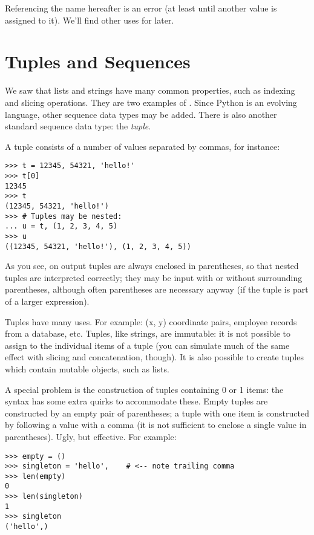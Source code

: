 \documentclass{manual}
\begin{document}
Referencing the name  hereafter is an error (at least until
another value is assigned to it).  We'll find other uses for
 later.


\section{Tuples and Sequences \label{tuples}}

We saw that lists and strings have many common properties, such as
indexing and slicing operations.  They are two examples of
.  Since
Python is an evolving language, other sequence data types may be
added.  There is also another standard sequence data type: the
\emph{tuple}.

A tuple consists of a number of values separated by commas, for
instance:

\begin{verbatim}
>>> t = 12345, 54321, 'hello!'
>>> t[0]
12345
>>> t
(12345, 54321, 'hello!')
>>> # Tuples may be nested:
... u = t, (1, 2, 3, 4, 5)
>>> u
((12345, 54321, 'hello!'), (1, 2, 3, 4, 5))
\end{verbatim}

As you see, on output tuples are always enclosed in parentheses, so
that nested tuples are interpreted correctly; they may be input with
or without surrounding parentheses, although often parentheses are
necessary anyway (if the tuple is part of a larger expression).

Tuples have many uses.  For example: (x, y) coordinate pairs, employee
records from a database, etc.  Tuples, like strings, are immutable: it
is not possible to assign to the individual items of a tuple (you can
simulate much of the same effect with slicing and concatenation,
though).  It is also possible to create tuples which contain mutable
objects, such as lists.

A special problem is the construction of tuples containing 0 or 1
items: the syntax has some extra quirks to accommodate these.  Empty
tuples are constructed by an empty pair of parentheses; a tuple with
one item is constructed by following a value with a comma
(it is not sufficient to enclose a single value in parentheses).
Ugly, but effective.  For example:

\begin{verbatim}
>>> empty = ()
>>> singleton = 'hello',    # <-- note trailing comma
>>> len(empty)
0
>>> len(singleton)
1
>>> singleton
('hello',)
\end{verbatim}
\end{document}
